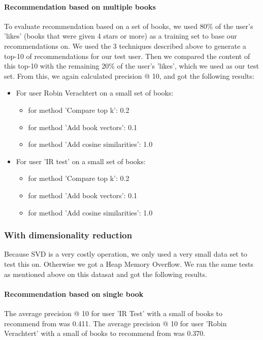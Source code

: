 \documentclass[10pt,a4paper]{paper}
\begin{document}
\paragraph{Recommendation based on multiple books}
To evaluate recommendation based on a set of books, we used 80\% of the user's 'likes' (books that were given 4 stars or more) as a training set to base our recommendations on. We used the 3 techniques described above to generate a top-10 of recommendations for our test user. Then we compared the content of this top-10 with the remaining 20\% of the user's 'likes', which we used as our test set.
From this, we again calculated precision @ 10, and got the following results:
\begin{itemize}
\item For user Robin Verachtert on a small set of books:
\begin{itemize}
\item for method 'Compare top k': 0.2
\item for method 'Add book vectors': 0.1
\item for method 'Add cosine similarities': 1.0
\end{itemize}
\item For user 'IR test' on a small set of books:
\begin{itemize}
\item for method 'Compare top k': 0.2
\item for method 'Add book vectors': 0.1
\item for method 'Add cosine similarities': 1.0
\end{itemize}
\end{itemize}


\subsubsection{With dimensionality reduction}
Because SVD is a very costly operation, we only used a very small data set to test this on. Otherwise we got a Heap Memory Overflow.
We ran the same tests as mentioned above on this datasat and got the following results.

\paragraph{Recommendation based on single book}

The average precision @ 10 for user 'IR Test' with a small of books to recommend from was 0.411.
The average precision @ 10 for user 'Robin Verachtert' with a small of books to recommend from was 0.370.
\end{document}
